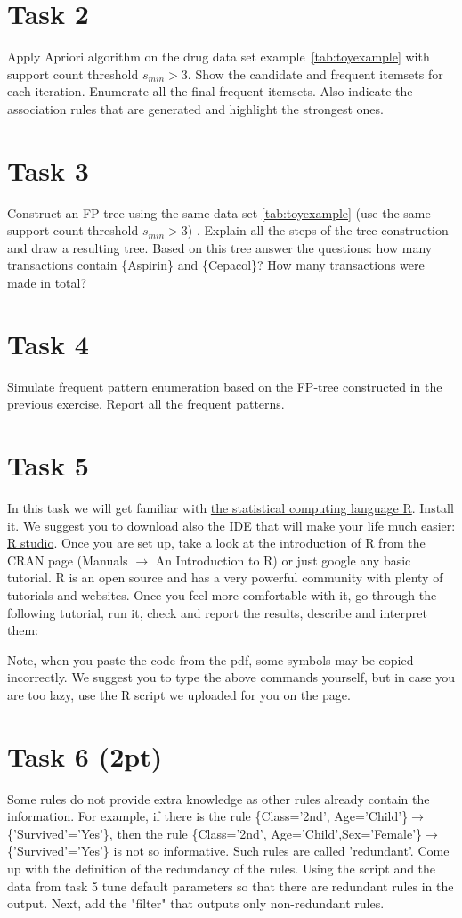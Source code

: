 \documentclass{article}
\begin{document}
\section*{Task 2}
Apply Apriori algorithm on the drug data set example~\ref{tab:toyexample} with support count threshold $s_{min} > 3$. Show the candidate and frequent itemsets for each iteration. Enumerate all the final frequent itemsets. Also indicate the association rules that are generated and highlight the strongest ones.
\section*{Task 3}
Construct an FP-tree using the same data set \ref{tab:toyexample} (use the same support count  threshold $s_{min} > 3$) . Explain all the steps of the tree construction and draw a resulting tree. Based on this tree answer the questions: how many transactions contain \{Aspirin\} and \{Cepacol\}? How many transactions were made in total?


\section*{Task 4}
Simulate frequent pattern enumeration based on the FP-tree constructed in the previous exercise. Report all the frequent patterns.
 
\section*{Task 5}
In this task we will get familiar with \href{http://www.r-project.org/}{the statistical computing language R}. Install it. We suggest you to download also the IDE that will make your life much easier: \href{https://www.rstudio.com/}{R studio}. Once you are set up, take a look at the introduction of R from the CRAN page (Manuals $\rightarrow$ An Introduction to R) or just google any basic tutorial. R is an open source and has a very powerful community with plenty of tutorials and websites. Once you feel more comfortable with it, go through the following tutorial, run it, check and report the results, describe and interpret them:

Note, when you paste the code from the pdf, some symbols may be copied incorrectly. We suggest you to type the above commands yourself, but in case you are too lazy, use the R script we uploaded for you on the page.  

\section*{Task 6 (2pt)}
Some rules do not provide extra knowledge as other rules already  contain the information. For example, if there is the rule \{Class='2nd', Age='Child'\}$\rightarrow$\\\{'Survived'='Yes'\}, then the rule \{Class='2nd', Age='Child',Sex='Female'\}$\rightarrow$\\\{'Survived'='Yes'\} is not so informative. Such rules are called 'redundant'. Come up with the definition of the redundancy of the rules. Using the script and the data from task 5 tune default parameters so that there are redundant rules in the output. Next, add the "filter" that outputs only non-redundant rules. 
\end{document}
